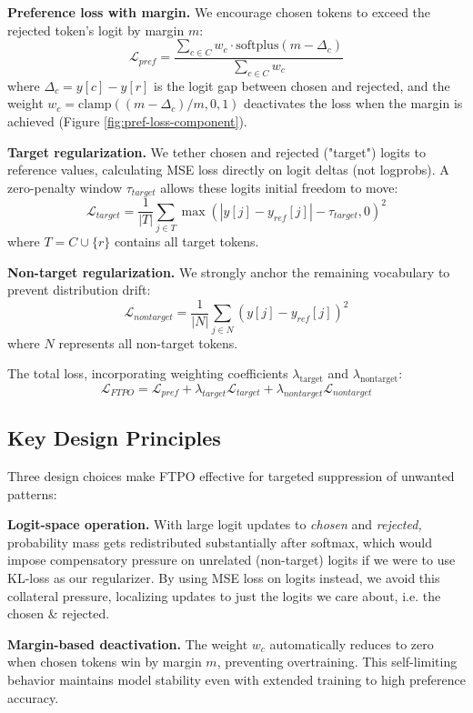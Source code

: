 \documentclass[11pt]{article}
\begin{document}
\textbf{Preference loss with margin.} We encourage chosen tokens to exceed the rejected token's logit by margin $m$:
$$\mathcal{L}_{pref} = \frac{\sum_{c \in C} w_c \cdot \text{softplus}(m - \Delta_c)}{\sum_{c \in C} w_c}$$
where $\Delta_c = y[c] - y[r]$ is the logit gap between chosen and rejected, and the weight $w_c = \text{clamp}((m-\Delta_c)/m, 0, 1)$ deactivates the loss when the margin is achieved (Figure \ref{fig:pref-loss-component}).

\textbf{Target regularization.} We tether chosen and rejected ("target") logits to reference values, calculating MSE loss directly on logit deltas (not logprobs). A zero-penalty window $\tau_{target}$ allows these logits initial freedom to move:
$$\mathcal{L}_{target} = \frac{1}{|T|} \sum_{j \in T} \max(|y[j] - y_{ref}[j]| - \tau_{target}, 0)^2$$
where $T = C \cup \{r\}$ contains all target tokens.

\textbf{Non-target regularization.} We strongly anchor the remaining vocabulary to prevent distribution drift:
$$\mathcal{L}_{nontarget} = \frac{1}{|N|} \sum_{j \in N} (y[j] - y_{ref}[j])^2$$
where $N$ represents all non-target tokens.

The total loss, incorporating weighting coefficients $\lambda_{\text{target}}$ and $\lambda_{\text{nontarget}}$:
$$\mathcal{L}_{FTPO} = \mathcal{L}_{pref} + \lambda_{target} \mathcal{L}_{target} + \lambda_{nontarget} \mathcal{L}_{nontarget}$$

\subsection{Key Design Principles}

Three design choices make FTPO effective for targeted suppression of unwanted patterns:

\textbf{Logit-space operation.} With large logit updates to \textit{chosen} and \textit{rejected,} probability mass gets redistributed substantially after softmax, which would impose compensatory pressure on unrelated (non-target) logits if we were to use KL-loss as our regularizer. By using MSE loss on logits instead, we avoid this collateral pressure, localizing updates to just the logits we care about, i.e. the chosen \& rejected.

\textbf{Margin-based deactivation.} The weight $w_c$ automatically reduces to zero when chosen tokens win by margin $m$, preventing overtraining. This self-limiting behavior maintains model stability even with extended training to high preference accuracy.
\end{document}
